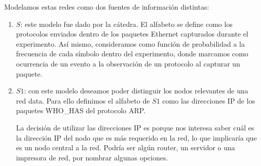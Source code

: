 Modelamos estas redes como dos fuentes de información distintas:
\begin{enumerate}
	\item $S$: este modelo fue dado por la cátedra. El alfabeto se define como los protocolos enviados dentro de los paquetes Ethernet capturados durante el experimento. Así mismo, consideramos como función de probabilidad a la frecuencia de cada símbolo dentro del experimento, donde marcamos como ocurrencia de un evento a la observación de un protocolo al capturar un paquete.
	\item $S1$: con este modelo deseamos poder distinguir los nodos relevantes de una red data. Para ello definimos el alfabeto de $S1$ como las direcciones IP de los paquetes WHO\_HAS del protocolo ARP.
	
La decisión de utilizar las direcciones IP es porque nos interesa saber cuál es la dirección IP del nodo que es más requerido en la red, lo que implicaría que es un nodo central a la red. Podría ser algún router, un servidor o una impresora de red, por nombrar algunas opciones.
% 
% 	
\end{enumerate}

